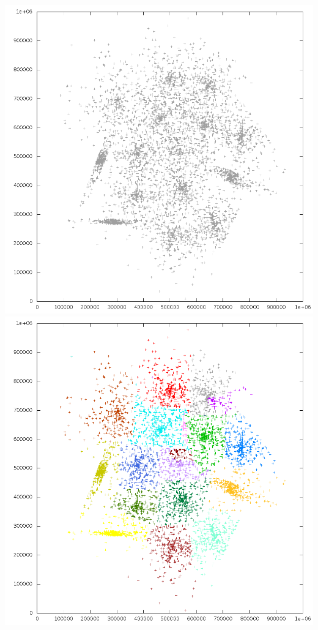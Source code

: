 \documentclass[10pt,utf8]{beamer}
\begin{document}
\begin{frame}
	\includegraphics[scale=0.22, keepaspectratio]{../output/pics/s4_black.png}
	\includegraphics[scale=0.22, keepaspectratio]{../output/pics/s4_colored.png}
\end{frame}
\end{document}
